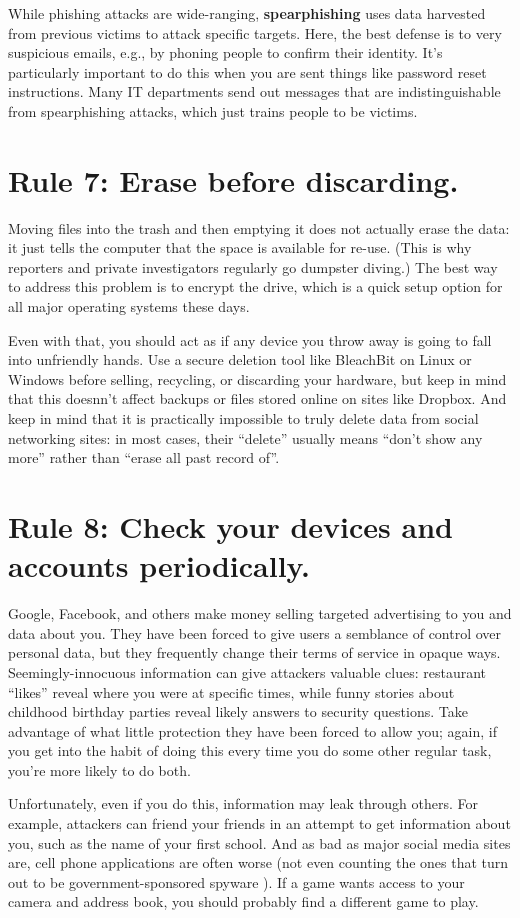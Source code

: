 \documentclass[10pt,letterpaper]{article}
\newcommand{\rulemajor}[1]{\section*{#1}}
\begin{document}
While phishing attacks are wide-ranging,
\textbf{spearphishing} uses data harvested from previous victims to attack specific targets.
Here,
the best defense is to very suspicious emails,
e.g., by phoning people to confirm their identity.
It's particularly important to do this when you are sent
things like password reset instructions.
Many IT departments send out messages that are indistinguishable from spearphishing attacks,
which just trains people to be victims.

\rulemajor{Rule 7: Erase before discarding.}

Moving files into the trash and then emptying it does not actually erase the data:
it just tells the computer that the space is available for re-use.
(This is why reporters and private investigators regularly go dumpster diving.)
The best way to address this problem is to encrypt the drive,
which is a quick setup option for all major operating systems these days.

Even with that,
you should act as if any device you throw away is going to fall into unfriendly hands.
Use a secure deletion tool like BleachBit on Linux or Windows
before selling, recycling, or discarding your hardware,
but keep in mind that this doesnn't affect backups or files stored online
on sites like Dropbox.
And keep in mind that it is practically impossible to truly delete data from social networking sites:
in most cases,
their ``delete'' usually means ``don't show any more''
rather than ``erase all past record of''.

\rulemajor{Rule 8: Check your devices and accounts periodically.}

Google, Facebook, and others make money selling targeted advertising to you and data about you.
They have been forced to give users a semblance of control over personal data,
but they frequently change their terms of service in opaque ways.
Seemingly-innocuous information can give attackers valuable clues:
restaurant ``likes'' reveal where you were at specific times,
while funny stories about childhood birthday parties reveal likely answers to security questions.
Take advantage of what little protection they have been forced to allow you;
again,
if you get into the habit of doing this every time you do some other regular task,
you're more likely to do both.

Unfortunately,
even if you do this,
information may leak through others.
For example,
attackers can friend your friends in an attempt to get information about you,
such as the name of your first school.
And as bad as major social media sites are,
cell phone applications are often worse
(not even counting the ones that turn out to be government-sponsored spyware \cite{Schn2019}).
If a game wants access to your camera and address book,
you should probably find a different game to play.
\end{document}
